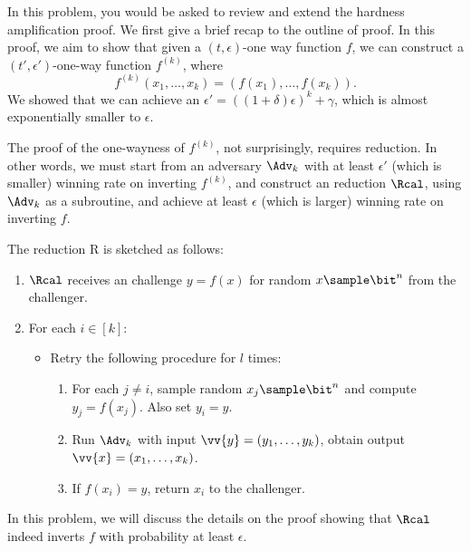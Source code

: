 \begin{problem}\label{p5}
\leavevmode\par
In this problem, you would be asked to review and extend the hardness amplification proof. We first give a brief recap to the outline of proof. In this proof, we aim to show that given a $(t,\epsilon)$-one way function $f$, we can construct a $(t',\epsilon')$-one-way function $f^{(k)}$, where
\[
    f^{(k)}(x_1,\ldots,x_k) = (f(x_1),\ldots,f(x_k)).
\]
We showed that we can achieve an $\epsilon'=((1+\delta)\epsilon)^k+\gamma$, which is almost exponentially smaller to $\epsilon$. 

The proof of the one-wayness of $f^{(k)}$, not surprisingly, requires reduction. In other words, we must start from an adversary $\Adv_k$ with at least $\epsilon'$ (which is smaller) winning rate on inverting $f^{(k)}$, and construct an reduction $\Rcal$, using $\Adv_k$ as a subroutine, and achieve at least $\epsilon$ (which is larger) winning rate on inverting $f$.

The reduction R is sketched as follows:
\begin{enumerate}
    \item $\Rcal$ receives an challenge $y = f(x)$ for random $x\sample\bit^n$ from the challenger.
    \item For each $i\in [k]$:
    \begin{itemize}
        \item Retry the following procedure for $l$ times:
        \begin{enumerate}
            \item For each $j\neq i$, sample random $x_j\sample\bit^n$ and compute $y_j=f(x_j)$. Also set $y_i=y$.
            \item Run $\Adv_k$ with input $\vv{y}=(y_1,\ldots,y_k)$, obtain output $\vv{x}=(x_1,\ldots,x_k)$.
            \item If $f(x_i)=y$, return $x_i$ to the challenger.
        \end{enumerate}
    \end{itemize}
\end{enumerate}

In this problem, we will discuss the details on the proof showing that $\Rcal$ indeed inverts $f$ with probability at least $\epsilon$. 


\end{problem}
